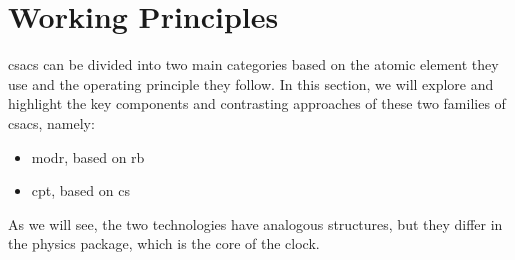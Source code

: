 \section{Working Principles}
\label{sec:working_principles}

\acrfull{csacs} can be divided into two main categories based on the atomic element they use and the operating principle they follow.
In this section, we will explore and highlight the key components and contrasting approaches of these two families of \acrshort{csacs}, namely:

\begin{itemize}
  \item \acrfull{modr}, based on \acrfull{rb}
  \item \acrfull{cpt}, based on \acrfull{cs}
\end{itemize}

As we will see, the two technologies have analogous structures, but they differ in the physics package, which is the core of the clock.




